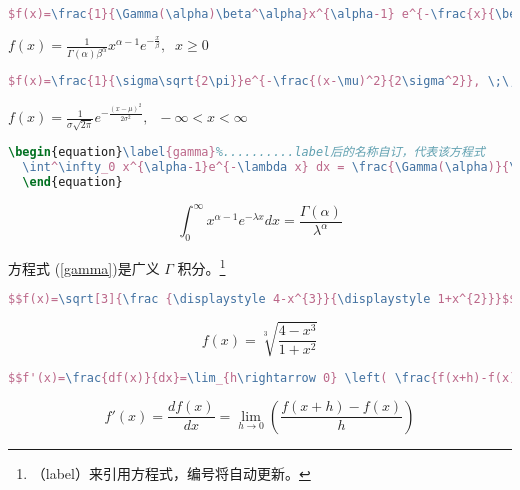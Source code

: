   \begin{lstlisting}[language=TeX,numbers=none,frame=lrtb,keywords={begin},label=Gamma,caption=Gamma] 
  $f(x)=\frac{1}{\Gamma(\alpha)\beta^\alpha}x^{\alpha-1} e^{-\frac{x}{\beta}}, \;\; x\geq 0$
  \end{lstlisting}
  $f(x)=\frac{1}{\Gamma(\alpha)\beta^\alpha}x^{\alpha-1}e^{-\frac{x}{\beta}}, \;\; x\geq 0$ 
  
  \begin{lstlisting}[language=TeX,numbers=none,frame=lrtb,keywords={begin},label=Normal,caption=Normal] 
  $f(x)=\frac{1}{\sigma\sqrt{2\pi}}e^{-\frac{(x-\mu)^2}{2\sigma^2}}, \;\;  -\infty < x < \infty $
  \end{lstlisting}
  $f(x)=\frac{1}{\sigma\sqrt{2\pi}}e^{-\frac{(x-\mu)^2}{2\sigma^2}}, \;\;  -\infty < x < \infty $
  
    \begin{lstlisting}[language=TeX,numbers=none,frame=lrtb,keywords={begin},label=Int,caption=\song 积分式与方程式编号] 
  \begin{equation}\label{gamma}%..........label后的名称自订，代表该方程式
  \int^\infty_0 x^{\alpha-1}e^{-\lambda x} dx = \frac{\Gamma(\alpha)}{\lambda^{\alpha}}
  \end{equation}
  \end{lstlisting}
  \begin{equation}\label{gamma}%
  \int^\infty_0 x^{\alpha-1}e^{-\lambda x} dx = \frac{\Gamma(\alpha)}{\lambda^{\alpha}}
  \end{equation}
  
  方程式 (\ref{gamma})是广义 $\Gamma$ 积分。\footnote{（label）来引用方程式，编号将自动更新。}
  
  \begin{lstlisting}[language=TeX,numbers=none,frame=lrtb,keywords={begin},label=Sqrt,caption=\song 开根号] 
  $$f(x)=\sqrt[3]{\frac {\displaystyle 4-x^{3}}{\displaystyle 1+x^{2}}}$$
  \end{lstlisting}
  $$f(x)=\sqrt[3]{\frac {\displaystyle 4-x^{3}}{\displaystyle 1+x^{2}}}$$
  
  \begin{lstlisting}[language=TeX,numbers=none,frame=lrtb,keywords={begin},label=limit,caption=\song 微分与极限（注意大刮号的使用）] 
  $$f'(x)=\frac{df(x)}{dx}=\lim_{h\rightarrow 0} \left( \frac{f(x+h)-f(x)}{h} \right)$$
  \end{lstlisting}  
  $$f'(x)=\frac{df(x)}{dx}=\lim_{h\rightarrow 0}\left(\frac{f(x+h)-f(x)}{h}\right)$$
  
